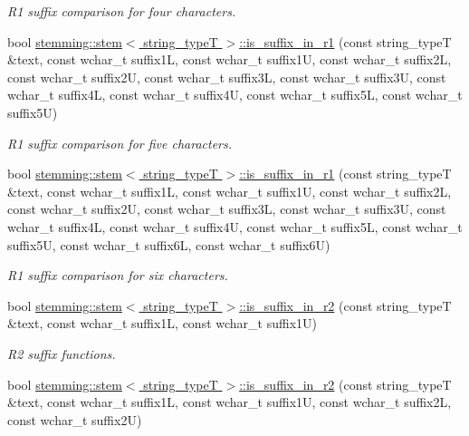 \begin{DoxyCompactItemize}
\begin{DoxyCompactList}\small\item\em R1 suffix comparison for four characters. \end{DoxyCompactList}\item 
\hypertarget{group___stemming_ga88f0e5e0cc055f013b6321215eb18ef3}{bool \hyperlink{group___stemming_ga88f0e5e0cc055f013b6321215eb18ef3}{stemming\-::stem$<$ string\-\_\-type\-T $>$\-::is\-\_\-suffix\-\_\-in\-\_\-r1} (const string\-\_\-type\-T \&text, const wchar\-\_\-t suffix1\-L, const wchar\-\_\-t suffix1\-U, const wchar\-\_\-t suffix2\-L, const wchar\-\_\-t suffix2\-U, const wchar\-\_\-t suffix3\-L, const wchar\-\_\-t suffix3\-U, const wchar\-\_\-t suffix4\-L, const wchar\-\_\-t suffix4\-U, const wchar\-\_\-t suffix5\-L, const wchar\-\_\-t suffix5\-U)}\label{group___stemming_ga88f0e5e0cc055f013b6321215eb18ef3}

\begin{DoxyCompactList}\small\item\em R1 suffix comparison for five characters. \end{DoxyCompactList}\item 
\hypertarget{group___stemming_ga19c2ee5166c7a9c81160408438c1f9a0}{bool \hyperlink{group___stemming_ga19c2ee5166c7a9c81160408438c1f9a0}{stemming\-::stem$<$ string\-\_\-type\-T $>$\-::is\-\_\-suffix\-\_\-in\-\_\-r1} (const string\-\_\-type\-T \&text, const wchar\-\_\-t suffix1\-L, const wchar\-\_\-t suffix1\-U, const wchar\-\_\-t suffix2\-L, const wchar\-\_\-t suffix2\-U, const wchar\-\_\-t suffix3\-L, const wchar\-\_\-t suffix3\-U, const wchar\-\_\-t suffix4\-L, const wchar\-\_\-t suffix4\-U, const wchar\-\_\-t suffix5\-L, const wchar\-\_\-t suffix5\-U, const wchar\-\_\-t suffix6\-L, const wchar\-\_\-t suffix6\-U)}\label{group___stemming_ga19c2ee5166c7a9c81160408438c1f9a0}

\begin{DoxyCompactList}\small\item\em R1 suffix comparison for six characters. \end{DoxyCompactList}\item 
bool \hyperlink{group___stemming_gac2c9cace7e6d90ca0b8c08f2ca2809e3}{stemming\-::stem$<$ string\-\_\-type\-T $>$\-::is\-\_\-suffix\-\_\-in\-\_\-r2} (const string\-\_\-type\-T \&text, const wchar\-\_\-t suffix1\-L, const wchar\-\_\-t suffix1\-U)
\begin{DoxyCompactList}\small\item\em R2 suffix functions. \end{DoxyCompactList}\item 
\hypertarget{group___stemming_ga8325bde2b5c8d5676d2b8e2b822b29a4}{bool \hyperlink{group___stemming_ga8325bde2b5c8d5676d2b8e2b822b29a4}{stemming\-::stem$<$ string\-\_\-type\-T $>$\-::is\-\_\-suffix\-\_\-in\-\_\-r2} (const string\-\_\-type\-T \&text, const wchar\-\_\-t suffix1\-L, const wchar\-\_\-t suffix1\-U, const wchar\-\_\-t suffix2\-L, const wchar\-\_\-t suffix2\-U)}\label{group___stemming_ga8325bde2b5c8d5676d2b8e2b822b29a4}


\end{DoxyCompactItemize}
